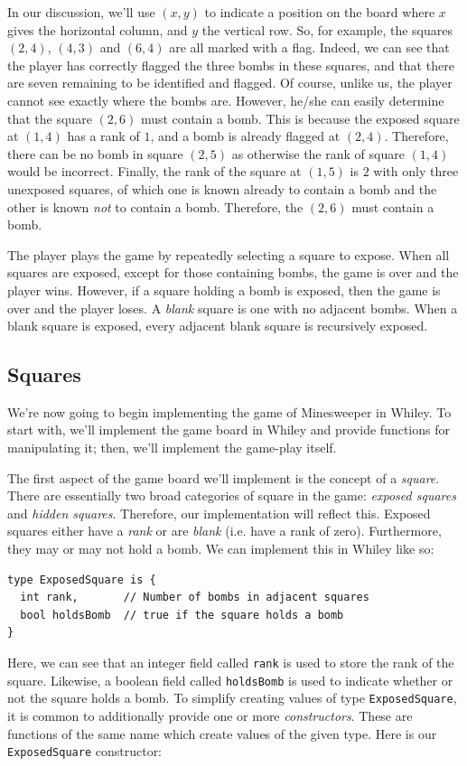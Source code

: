 In our discussion, we'll use $(x,y)$ to indicate a position on the board where $x$ gives the horizontal column, and $y$ the vertical row.  So, for example, the squares $(2,4)$, $(4,3)$ and $(6,4)$ are all marked with a flag.  Indeed, we can see that the player has correctly flagged the three bombs in these squares, and that there are seven remaining to be identified and flagged.  Of course, unlike us, the player cannot see exactly where the bombs are.  However, he/she can easily determine that the square $(2,6)$ must contain a bomb.  This is because the exposed square at $(1,4)$ has a rank of $1$, and a bomb is already flagged at $(2,4)$.  Therefore, there can be no bomb in square $(2,5)$ as otherwise the rank of square $(1,4)$ would be incorrect.  Finally, the rank of the square at $(1,5)$ is $2$ with only three unexposed squares, of which one is known already to contain a bomb and the other is known {\em not} to contain a bomb.  Therefore, the $(2,6)$ must contain a bomb.

The player plays the game by repeatedly selecting a square to expose.  When all squares are exposed, except for those containing bombs, the game is over and the player wins.  However, if a square holding a bomb is exposed, then the game is over and the player loses.  A {\em blank} square is one with no adjacent bombs.  When a blank square is exposed, every adjacent blank square is recursively exposed.

\subsection{Squares}
We're now going to begin implementing the game of Minesweeper in Whiley.  To start with, we'll implement the game board in Whiley and provide functions for manipulating it; then, we'll implement the game-play itself.  

The first aspect of the game board we'll implement is the concept of a {\em square}.  There are essentially two broad categories of square in the game: {\em exposed squares} and {\em hidden squares}.  Therefore, our implementation will reflect this.  Exposed squares either have a {\em rank} or are {\em blank} (i.e. have a rank of zero).  Furthermore, they may or may not hold a bomb.  We can implement this in Whiley like so:
\begin{lstlisting}
type ExposedSquare is { 
  int rank,       // Number of bombs in adjacent squares
  bool holdsBomb  // true if the square holds a bomb
}
\end{lstlisting}
Here, we can see that an integer field called \lstinline{rank} is used to store the rank of the square.  Likewise, a boolean field called \lstinline{holdsBomb} is used to indicate whether or not the square holds a bomb.  To simplify creating values of type \lstinline{ExposedSquare}, it is common to additionally provide one or more {\em constructors}.  These are functions of the same name which create values of the given type.  Here is our \lstinline{ExposedSquare} constructor:

